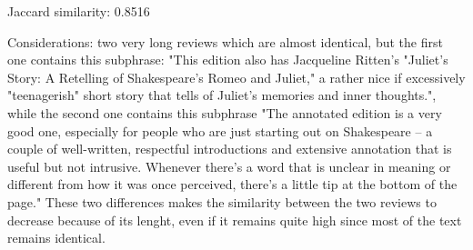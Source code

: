 \documentclass[12pt, a4paper[]{article}
\begin{document}
\begin{itemize}
{    \item Jaccard similarity: 0.8516
    \item Considerations: two very long reviews which are almost identical, but the first one contains this subphrase: "This edition also has Jacqueline Ritten's "Juliet's Story: A Retelling of Shakespeare's Romeo and Juliet," a rather nice if excessively "teenagerish" short story that tells of Juliet's memories and inner thoughts.", while the second one contains this subphrase "The annotated edition is a very good one, especially for people who are just starting out on Shakespeare -- a couple of well-written, respectful introductions and extensive annotation that is useful but not intrusive. Whenever there's a word that is unclear in meaning or different from how it was once perceived, there's a little tip at the bottom of the page." These two differences makes the similarity between the two reviews to decrease because of its lenght, even if it remains quite high since most of the text remains identical.
    }
\end{itemize}
\dotfill
\end{document}
